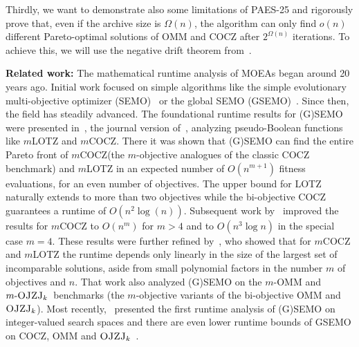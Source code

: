 \documentclass[
sigconf = false, %
review = false, %
screen = true, %
anonymous = true, %
format=acmsmall
]{acmart}
\newcommand{\OMM}{\textsc{OMM}\xspace}
\newcommand{\COCZ}{\textsc{COCZ}\xspace}
\newcommand{\LOTZ}{\textsc{LOTZ}\xspace}
\newcommand{\mLOTZ}{\ensuremath{m}\text{-}\textsc{LOTZ}\xspace}
\newcommand{\mCOCZ}{\ensuremath{m}\text{-}\textsc{COCZ}\xspace}
\newcommand{\OJZJk}{$\ensuremath{m}\text{-}\textsc{OJZJ}_k\xspace$}
\newcommand{\ojzjk}{$\textsc{OJZJ}_k\xspace$}
\newcommand{\PAES}{PAES-25\xspace}
\begin{document}
Thirdly, we want to demonstrate also some limitations of \PAES and rigorously prove that, even if the archive size is $\Omega(n)$, the algorithm can only find $o(n)$ different Pareto-optimal solutions of \OMM and \COCZ after $2^{\Omega(n)}$ iterations. To achieve this, we will use the negative drift theorem from~\cite{Lengler2020Drift}.

\textbf{Related work:} The mathematical runtime analysis of MOEAs began around 20 years ago. Initial work focused on simple algorithms like the simple evolutionary multi-objective optimizer (SEMO)~\cite{LaumannsTZWD02} or the global SEMO (GSEMO)~\cite{Giel03}. Since then, the field has steadily advanced. The foundational runtime results for (G)SEMO were presented in~\cite{LaumannsTZ04}, the journal version of~\cite{LaumannsTZWD02}, analyzing pseudo-Boolean functions like \mLOTZ and \mCOCZ. There it was shown that (G)SEMO can find the entire Pareto front of \mCOCZ (the $m$-objective analogues of the classic \COCZ benchmark) and \mLOTZ in an expected number of $O(n^{m+1})$ fitness evaluations, for an even number of objectives. The upper bound for \LOTZ naturally extends to more than two objectives while the bi-objective \COCZ guarantees a runtime of $O(n^2 \log(n))$. Subsequent work by~\citet{BianQT18ijcaigeneral} improved the results for \mCOCZ to $O(n^m)$ for $m > 4$ and to $O(n^3\log n)$ in the special case $m = 4$. These results were further refined by~\cite{DoerrNearTight}, who showed that for \mCOCZ and \mLOTZ the runtime depends only linearly in the size of the largest set of incomparable solutions, aside from small polynomial factors in the number $m$ of objectives and $n$. That work also analyzed (G)SEMO on the $m$-\OMM and \OJZJk~benchmarks (the $m$-objective variants of the bi-objective \OMM and \ojzjk). Most recently,~\citet{Doerr_Krejca_Rudolph_2025} presented the first runtime analysis of (G)SEMO on integer-valued search spaces and there are even lower runtime bounds of GSEMO on \COCZ,  \OMM and \ojzjk~\cite{doerr2025tightruntimeguaranteesunderstanding}. 
\end{document}
